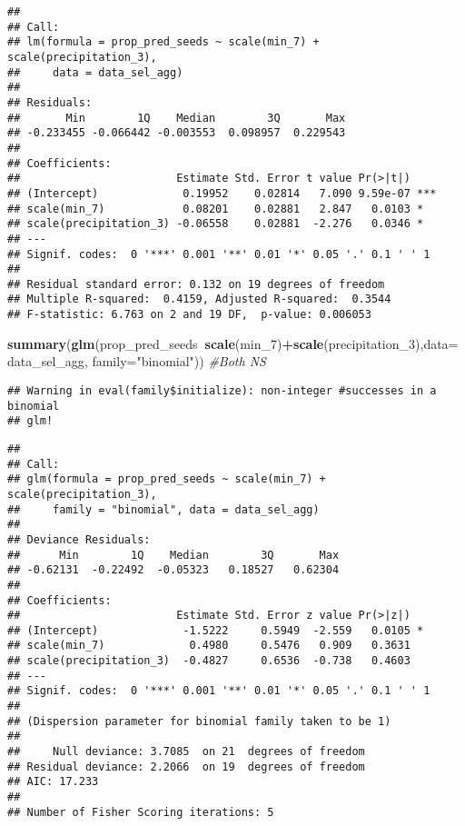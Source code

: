 \documentclass[]{article}
\newenvironment{Shaded}{\begin{snugshade}}{\end{snugshade}}
\newcommand{\KeywordTok}[1]{\textcolor[rgb]{0.13,0.29,0.53}{\textbf{#1}}}
\newcommand{\DataTypeTok}[1]{\textcolor[rgb]{0.13,0.29,0.53}{#1}}
\newcommand{\DecValTok}[1]{\textcolor[rgb]{0.00,0.00,0.81}{#1}}
\newcommand{\StringTok}[1]{\textcolor[rgb]{0.31,0.60,0.02}{#1}}
\newcommand{\CommentTok}[1]{\textcolor[rgb]{0.56,0.35,0.01}{\textit{#1}}}
\newcommand{\OperatorTok}[1]{\textcolor[rgb]{0.81,0.36,0.00}{\textbf{#1}}}
\newcommand{\NormalTok}[1]{#1}
\begin{document}
\begin{verbatim}
## 
## Call:
## lm(formula = prop_pred_seeds ~ scale(min_7) + scale(precipitation_3), 
##     data = data_sel_agg)
## 
## Residuals:
##       Min        1Q    Median        3Q       Max 
## -0.233455 -0.066442 -0.003553  0.098957  0.229543 
## 
## Coefficients:
##                        Estimate Std. Error t value Pr(>|t|)    
## (Intercept)             0.19952    0.02814   7.090 9.59e-07 ***
## scale(min_7)            0.08201    0.02881   2.847   0.0103 *  
## scale(precipitation_3) -0.06558    0.02881  -2.276   0.0346 *  
## ---
## Signif. codes:  0 '***' 0.001 '**' 0.01 '*' 0.05 '.' 0.1 ' ' 1
## 
## Residual standard error: 0.132 on 19 degrees of freedom
## Multiple R-squared:  0.4159, Adjusted R-squared:  0.3544 
## F-statistic: 6.763 on 2 and 19 DF,  p-value: 0.006053
\end{verbatim}

\begin{Shaded}
\begin{Highlighting}[]
\KeywordTok{summary}\NormalTok{(}\KeywordTok{glm}\NormalTok{(prop_pred_seeds}\OperatorTok{~}\KeywordTok{scale}\NormalTok{(min_}\DecValTok{7}\NormalTok{)}\OperatorTok{+}\KeywordTok{scale}\NormalTok{(precipitation_}\DecValTok{3}\NormalTok{),}\DataTypeTok{data=}\NormalTok{data_sel_agg,}
            \DataTypeTok{family=}\StringTok{"binomial"}\NormalTok{)) }\CommentTok{#Both NS}
\end{Highlighting}
\end{Shaded}

\begin{verbatim}
## Warning in eval(family$initialize): non-integer #successes in a binomial
## glm!
\end{verbatim}

\begin{verbatim}
## 
## Call:
## glm(formula = prop_pred_seeds ~ scale(min_7) + scale(precipitation_3), 
##     family = "binomial", data = data_sel_agg)
## 
## Deviance Residuals: 
##      Min        1Q    Median        3Q       Max  
## -0.62131  -0.22492  -0.05323   0.18527   0.62304  
## 
## Coefficients:
##                        Estimate Std. Error z value Pr(>|z|)  
## (Intercept)             -1.5222     0.5949  -2.559   0.0105 *
## scale(min_7)             0.4980     0.5476   0.909   0.3631  
## scale(precipitation_3)  -0.4827     0.6536  -0.738   0.4603  
## ---
## Signif. codes:  0 '***' 0.001 '**' 0.01 '*' 0.05 '.' 0.1 ' ' 1
## 
## (Dispersion parameter for binomial family taken to be 1)
## 
##     Null deviance: 3.7085  on 21  degrees of freedom
## Residual deviance: 2.2066  on 19  degrees of freedom
## AIC: 17.233
## 
## Number of Fisher Scoring iterations: 5
\end{verbatim}
\end{document}
